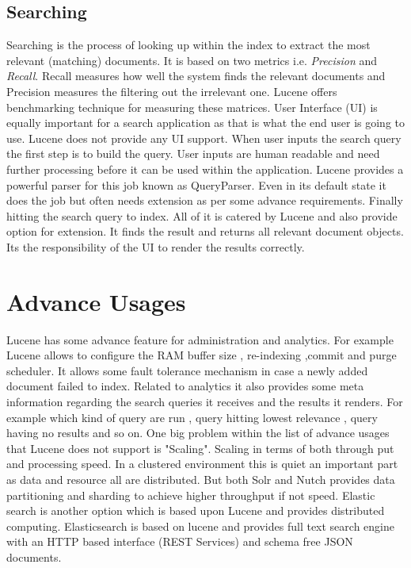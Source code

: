 \documentclass[9pt,twocolumn,twoside]{../../styles/osajnl}
\begin{document}
\subsection{Searching}
Searching is the process of looking up within the index to extract the most relevant (matching) documents. It is based on two metrics i.e. \textit{Precision} and \textit{Recall}. Recall measures how well the system finds the relevant documents and Precision measures the filtering out the irrelevant one. Lucene offers benchmarking technique for measuring these matrices. User Interface (UI) is equally important for a search application as that is what the end user is going to use. Lucene does not provide any UI support. When user inputs the search query the first step is to build the query. User inputs are human readable and need further processing before it can be used within the application. Lucene provides a powerful parser for this job known as QueryParser. Even in its default state it does the job but often needs extension as per some advance requirements. Finally hitting the search query to index. All of it is catered by Lucene and also provide option for extension. It finds the result and returns all relevant document objects. Its the responsibility of the UI to render the results correctly.

\section{Advance Usages}
Lucene has some advance feature for administration and analytics. For example Lucene allows to configure the RAM buffer size , re-indexing ,commit and purge scheduler. It allows some fault tolerance mechanism in case a newly added document failed to index. Related to analytics it also provides some meta information regarding the search queries it receives and the results it renders. For example which kind of query are run , query hitting lowest relevance , query having no results and so on. One big problem within the list of advance usages that Lucene does not support is "Scaling". Scaling in terms of both through put and processing speed. In a clustered environment this is quiet an important part as data and resource all are distributed. But both Solr and Nutch provides data partitioning and sharding to achieve higher throughput if not speed. Elastic search is another option which is based upon Lucene and provides distributed computing. Elasticsearch is based on lucene and provides full text search engine with an HTTP based interface (REST Services) and schema free JSON documents. 
\end{document}

